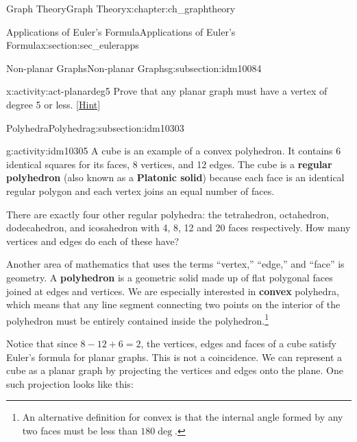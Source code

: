 \documentclass[oneside,10pt,]{book}
\newcommand{\terminology}[1]{\textbf{#1}}
\numberwithin{equation}{chapter}
\newcommand{\vtx}[2]{node[fill,circle,inner sep=0pt, minimum size=4pt,label=#1:#2]{}}
\renewcommand{\v}{\vtx{above}{}}
\begin{document}
\begin{chapterptx}{Graph Theory}{}{Graph Theory}{}{}{x:chapter:ch_graphtheory}
\begin{sectionptx}{Applications of Euler's Formula}{}{Applications of Euler's Formula}{}{}{x:section:sec_eulerapps}
\begin{subsectionptx}{Non-planar Graphs}{}{Non-planar Graphs}{}{}{g:subsection:idm10084}
\begin{activity}{}{x:activity:act-planardeg5}
Prove that any planar graph must have a vertex of degree 5 or less.%
\space\hspace*{0pt}\hfill{\tiny\hyperlink{g:hint:idm10294-back}{[Hint]}}\end{activity}
\end{subsectionptx}
%
%
\typeout{************************************************}
\typeout{************************************************}
%
\begin{subsectionptx}{Polyhedra}{}{Polyhedra}{}{}{g:subsection:idm10303}
\begin{activity}{}{g:activity:idm10305}%
A cube is an example of a convex polyhedron. It contains 6 identical squares for its faces, 8 vertices, and 12 edges. The cube is a \terminology{regular polyhedron} (also known as a \terminology{Platonic solid}) because each face is an identical regular polygon and each vertex joins an equal number of faces.%
\par
There are exactly four other regular polyhedra: the tetrahedron, octahedron, dodecahedron, and icosahedron with 4, 8, 12 and 20 faces respectively. How many vertices and edges do each of these have?%
\end{activity}
Another area of mathematics that uses the terms ``vertex,'' ``edge,'' and ``face'' is geometry. A \terminology{polyhedron} is a geometric solid made up of flat polygonal faces joined at edges and vertices. We are especially interested in \terminology{convex} polyhedra, which means that any line segment connecting two points on the interior of the polyhedron must be entirely contained inside the polyhedron.\footnote{An alternative definition for convex is that the internal angle formed by any two faces must be less than \(180\deg\).\label{g:fn:idm10325}}%
\par
Notice that since \(8 - 12 + 6 = 2\), the vertices, edges and faces of a cube satisfy Euler's formula for planar graphs. This is not a coincidence. We can represent a cube as a planar graph by projecting the vertices and edges onto the plane. One such projection looks like this:%
\begin{sidebyside}{1}{0.4}{0.4}{0}%
\begin{sbspanel}{0.2}%
\resizebox{\linewidth}{!}{%
\begin{tikzpicture}
  \foreach \ang in {45, 135, 225, 315} {
  \draw (\ang:.4) \v -- (\ang:1) \v -- (\ang+90:1) (\ang:.4) -- (\ang+90:.4);
  }
  \end{tikzpicture}
}
\end{sbspanel}
\end{sidebyside}
\end{subsectionptx}
\end{sectionptx}
\end{chapterptx}
\end{document}
